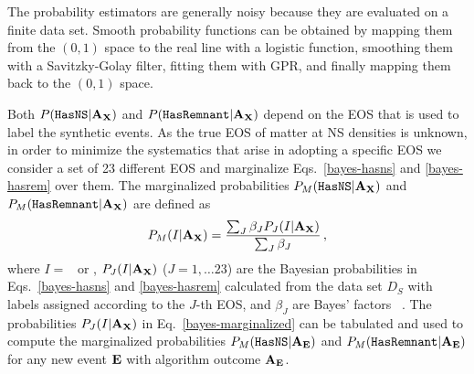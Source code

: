 The probability estimators are generally noisy because they are evaluated on a finite data set. Smooth probability functions can be obtained by mapping them from the $(0,1)$ space to the
real line with a logistic function, smoothing them with a Savitzky-Golay filter, fitting them with \ac{GPR}, and finally mapping them back to the $(0,1)$ space.   

Both $P({{\tt HasNS}}|{\bf A}_{\bf X})$ and $P({{\tt HasRemnant}}|{\bf A}_{\bf X})$ depend on the \ac{EOS} that is used to label the synthetic events. As the true \ac{EOS} of matter at \ac{NS} densities is
unknown, in order to minimize the systematics that arise in adopting a specific \ac{EOS} we consider a set of 23 different \ac{EOS} and marginalize Eqs.~\eqref{bayes-hasns} and
\eqref{bayes-hasrem} over them. The marginalized probabilities $P_M({{\tt HasNS}}|{\bf A}_{\bf X})$ and $P_M({{\tt HasRemnant}}|{\bf A}_{\bf X})$ are defined as
%
\begin{equation}
\begin{aligned}
P_M(I|{\bf A}_{\bf X})=\frac{\sum_J\beta_J P_J(I|{\bf A}_{\bf X})}{\sum_J\beta_J}\,,
\label{bayes-marginalized}
\end{aligned}
\end{equation}
%
where $I=$ \hasns\ or \hasrem, $P_J(I|{\bf A}_{\bf X})$ ($J=1,\dots 23$) are the Bayesian probabilities in Eqs.~\eqref{bayes-hasns} and \eqref{bayes-hasrem} calculated from the data set
$D_S$ with labels assigned according to the $J$-th \ac{EOS}, and $\beta_J$ are Bayes' factors ~\cite{Ghosh:2021eqv}. The probabilities $P_J(I|{\bf A}_{\bf X})$ in
Eq.~\eqref{bayes-marginalized} can be tabulated and used to compute the marginalized probabilities $P_M({{\tt HasNS}}|{\bf A}_{\bf E})$ and $P_M({{\tt HasRemnant}}|{\bf A}_{\bf E})$ for any new event $\bf
E$ with algorithm outcome $\bf A_{E}$. 

